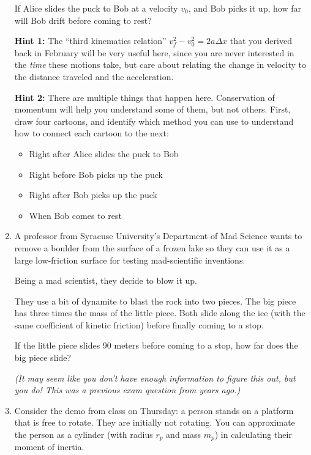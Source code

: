 \documentclass[12pt]{article}
\begin{document}
\begin{enumerate}
If Alice slides the puck to Bob at a velocity $v_0$, and Bob picks it up, how far will Bob drift before coming to rest?

{\bf Hint 1:} The ``third kinematics relation'' $v_f^2 - v_0^2 = 2a\Delta x$ that you derived back in February will be very useful here, since you are never interested in the {\it time} these motions take, but care about relating the change in velocity to the distance traveled and the acceleration.

{\bf Hint 2:} There are multiple things that happen here. Conservation of momentum will help you understand some of them, but not others. First, draw four cartoons, and identify which method you can use to understand how to connect each cartoon to the next:

\begin{itemize}
	\item Right after Alice slides the puck to Bob
	\item Right before Bob picks up the puck
	\item Right after Bob picks up the puck
	\item When Bob comes to rest
\end{itemize}


\bigskip \newpage

\item A professor from Syracuse University's Department of Mad Science wants to remove a boulder from the surface of a frozen lake so they can use it as a large low-friction surface for testing mad-scientific inventions. 

Being a mad scientist, they decide to blow it up.

They use a bit of dynamite to blast the rock into two pieces. The big piece has three times the mass of the little piece. Both slide along the ice (with the same coefficient of kinetic friction) before finally coming to a stop.

If the little piece slides 90 meters before coming to a stop, how far does the big piece slide?

{\it (It may seem like you don't have enough information to figure this out, but you do! This was a previous exam question from years ago.)}

\bigskip

\item Consider the demo from class on Thursday: a person stands on a platform that is free to rotate. They are initially not rotating. You can approximate the person as a cylinder (with radius $r_p$ and mass $m_p$) in calculating their moment of inertia.


\end{enumerate}
\end{document}
